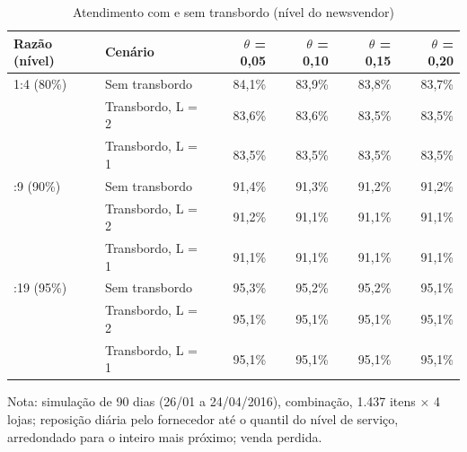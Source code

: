 \begin{table}[htbp]
\centering
\small
\caption{Atendimento com e sem transbordo (nível do newsvendor)}
\label{tab:tb_atendimento}
\begin{tabular}{llrrrr}
\toprule
Razão (nível) & Cenário & $\theta$ = 0,05 & $\theta$ = 0,10 & $\theta$ = 0,15 & $\theta$ = 0,20 \\
\midrule
1:4 (80\%) & Sem transbordo & 84,1\% & 83,9\% & 83,8\% & 83,7\% \\
 & Transbordo, L = 2 & 83,6\% & 83,6\% & 83,5\% & 83,5\% \\
 & Transbordo, L = 1 & 83,5\% & 83,5\% & 83,5\% & 83,5\% \\
\addlinespace
1:9 (90\%) & Sem transbordo & 91,4\% & 91,3\% & 91,2\% & 91,2\% \\
 & Transbordo, L = 2 & 91,2\% & 91,1\% & 91,1\% & 91,1\% \\
 & Transbordo, L = 1 & 91,1\% & 91,1\% & 91,1\% & 91,1\% \\
\addlinespace
1:19 (95\%) & Sem transbordo & 95,3\% & 95,2\% & 95,2\% & 95,1\% \\
 & Transbordo, L = 2 & 95,1\% & 95,1\% & 95,1\% & 95,1\% \\
 & Transbordo, L = 1 & 95,1\% & 95,1\% & 95,1\% & 95,1\% \\
\bottomrule
\end{tabular}
\par\smallskip
{\footnotesize Nota: simulação de 90 dias (26/01 a 24/04/2016), combinação, 1.437 itens × 4 lojas; reposição diária pelo fornecedor até o quantil do nível de serviço, arredondado para o inteiro mais próximo; venda perdida.}
\end{table}
